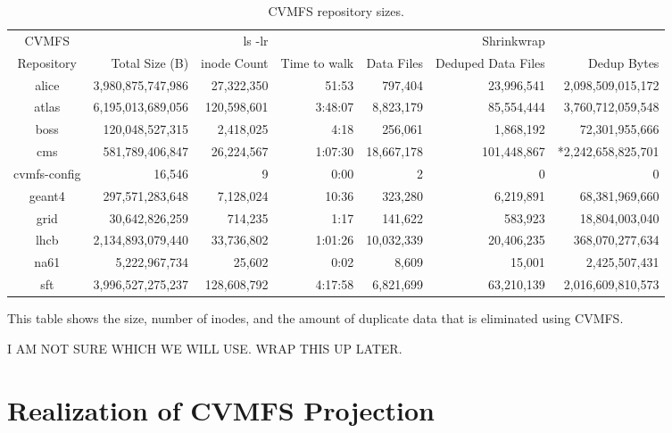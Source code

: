 \documentclass[conference]{IEEEtran}
\begin{document}
\begin{table}[t]
\begin{center}
\begin{tabular}{|c|r r r|r r r|}
\hline
CVMFS & & ls -lr & & & Shrinkwrap & \\
Repository & Total Size (B) & inode Count & Time to walk & 
  Data Files & Deduped Data Files & Dedup Bytes \\ \hline
alice & 3,980,875,747,986 & 27,322,350 & 51:53 & 
  797,404 & 23,996,541 & 2,098,509,015,172\\
atlas & 6,195,013,689,056 & 120,598,601 & 3:48:07 &
 8,823,179 & 85,554,444 & 3,760,712,059,548 \\
boss & 120,048,527,315 & 2,418,025 & 4:18 &
 256,061 & 1,868,192 & 72,301,955,666\\
cms & 581,789,406,847 & 26,224,567 & 1:07:30 &
 18,667,178 & 101,448,867 & *2,242,658,825,701\\
cvmfs-config & 16,546 & 9 & 0:00 &
 2 & 0 & 0 \\
geant4 & 297,571,283,648 & 7,128,024 & 10:36 &
 323,280 & 6,219,891 & 68,381,969,660 \\
grid & 30,642,826,259 & 714,235 & 1:17 &
 141,622 & 583,923 & 18,804,003,040 \\
lhcb & 2,134,893,079,440 & 33,736,802 & 1:01:26 &
 10,032,339 & 20,406,235 & 368,070,277,634 \\
na61 & 5,222,967,734 & 25,602 & 0:02 &
 8,609 & 15,001 & 2,425,507,431 \\
sft & 3,996,527,275,237 & 128,608,792 & 4:17:58 &
 6,821,699 & 63,210,139 & 2,016,609,810,573 \\ 
 \hline
\end{tabular}
\caption{CVMFS repository sizes.}
\label{tab:repo-sizes}
This table shows the size, number of inodes, and the amount
of duplicate data that is eliminated using CVMFS.
\end{center}
\end{table}

I AM NOT SURE WHICH WE WILL USE. WRAP THIS UP LATER.
\fi

\section{Realization of CVMFS Projection}
\end{document}

